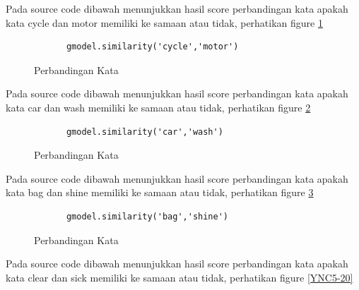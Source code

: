 \begin{enumerate}
	\subitem Pada source code dibawah menunjukkan hasil score perbandingan kata apakah kata cycle dan motor memiliki ke samaan atau tidak, perhatikan figure \ref{YNC5-17}

		\begin{verbatim}
			gmodel.similarity('cycle','motor')
		\end{verbatim}

		\begin{figure}[!htbp]
			\caption{Perbandingan Kata}
			\label{YNC5-17}
		\end{figure}

Pada source code dibawah menunjukkan hasil score perbandingan kata apakah kata car dan wash memiliki ke samaan atau tidak, perhatikan figure \ref{YNC5-18}

		\begin{verbatim}
			gmodel.similarity('car','wash')
		\end{verbatim}

		\begin{figure}[!htbp]
			\caption{Perbandingan Kata}
			\label{YNC5-18}
		\end{figure}

Pada source code dibawah menunjukkan hasil score perbandingan kata apakah kata bag dan shine memiliki ke samaan atau tidak, perhatikan figure \ref{YNC5-19}

		\begin{verbatim}
			gmodel.similarity('bag','shine')
		\end{verbatim}

		\begin{figure}[!htbp]
			\caption{Perbandingan Kata}
			\label{YNC5-19}
		\end{figure}

Pada source code dibawah menunjukkan hasil score perbandingan kata apakah kata clear dan sick memiliki ke samaan atau tidak, perhatikan figure \ref{YNC5-20}


\end{enumerate}
